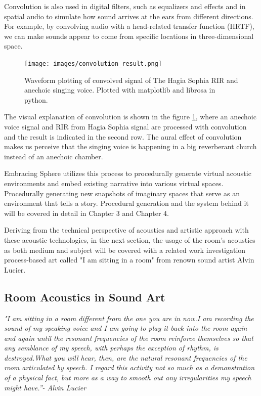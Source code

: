             Convolution is also used in digital filters, such as equalizers and effects and in spatial audio to simulate how sound arrives at the ears from different directions. For example, by convolving audio with a head-related transfer function (HRTF), we can make sounds appear to come from specific locations in three-dimensional space\cite{3D_Audio}.\par

            \begin{figure}[H]
                \centering
                \texttt{[image: images/convolution\_result.png]}
                \caption{Waveform plotting of convolved signal of The Hagia Sophia RIR and anechoic singing voice. Plotted with matplotlib and librosa in python.}
                \label{fig:CONV_RESULT}
            \end{figure}
            
            The visual explanation of convolution is shown in the figure \ref{fig:CONV_RESULT}, where an anechoic voice signal and RIR from Hagia Sophia signal are processed with convolution and the result is indicated in the second row. The aural effect of convolution makes us perceive that the singing voice is happening in a big reverberant church instead of an anechoic chamber.\par

            Embracing Sphere utilizes this process to procedurally generate virtual acoustic environments and embed existing narrative into various virtual spaces. Procedurally generating new snapshots of imaginary spaces that serve as an environment that tells a story. Procedural generation and the system behind it will be covered in detail in Chapter 3 and Chapter 4.\par

            Deriving from the technical perspective of acoustics and artistic approach with these acoustic technologies, in the next section, the usage of the room's acoustics as both medium and subject will be covered with a related work investigation process-based art called "I am sitting in a room" from renown sound artist Alvin Lucier.\par
        \subsection{Room Acoustics in Sound Art}
            \emph{"I am sitting in a room different from the one you are in now.\newline I am recording the sound of my speaking voice and I am going to play it back into the room again and again until the resonant frequencies of the room reinforce themselves so that any semblance of my speech, with perhaps the exception of rhythm, is destroyed.\newline What you will hear, then, are the natural resonant frequencies of the room articulated by speech. I regard this activity not so much as a demonstration of a physical fact, but more as a way to smooth out any irregularities my speech might have.”\newline - Alvin Lucier\cite{Alvin_Lucier_I_am_Sitting_in_a_Room}}

